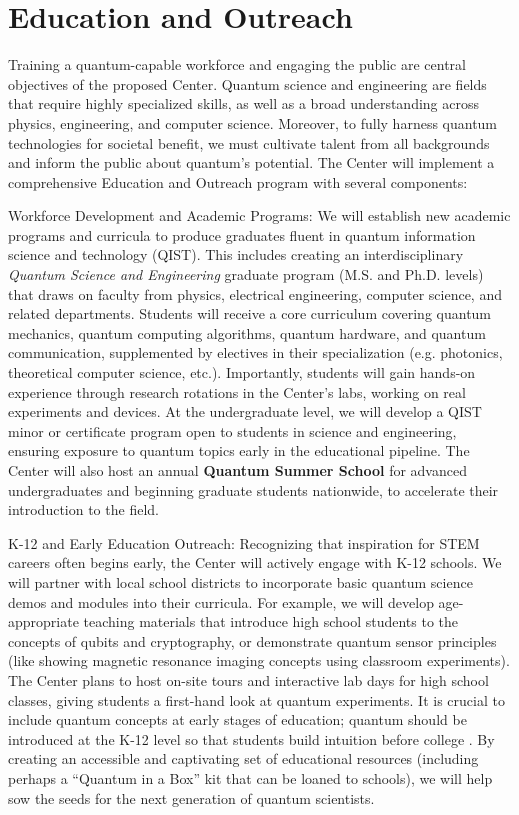 \documentclass[12pt]{article}
\begin{document}
\section{Education and Outreach}



Training a quantum-capable workforce and engaging the public are central objectives of the proposed Center. Quantum science and engineering are fields that require highly specialized skills, as well as a broad understanding across physics, engineering, and computer science. Moreover, to fully harness quantum technologies for societal benefit, we must cultivate talent from all backgrounds and inform the public about quantum’s potential. The Center will implement a comprehensive Education and Outreach program with several components:



Workforce Development and Academic Programs: We will establish new academic programs and curricula to produce graduates fluent in quantum information science and technology (QIST). This includes creating an interdisciplinary \emph{Quantum Science and Engineering} graduate program (M.S. and Ph.D. levels) that draws on faculty from physics, electrical engineering, computer science, and related departments. Students will receive a core curriculum covering quantum mechanics, quantum computing algorithms, quantum hardware, and quantum communication, supplemented by electives in their specialization (e.g. photonics, theoretical computer science, etc.). Importantly, students will gain hands-on experience through research rotations in the Center’s labs, working on real experiments and devices. At the undergraduate level, we will develop a QIST minor or certificate program open to students in science and engineering, ensuring exposure to quantum topics early in the educational pipeline. The Center will also host an annual \textbf{Quantum Summer School} for advanced undergraduates and beginning graduate students nationwide, to accelerate their introduction to the field.



K-12 and Early Education Outreach: Recognizing that inspiration for STEM careers often begins early, the Center will actively engage with K-12 schools. We will partner with local school districts to incorporate basic quantum science demos and modules into their curricula. For example, we will develop age-appropriate teaching materials that introduce high school students to the concepts of qubits and cryptography, or demonstrate quantum sensor principles (like showing magnetic resonance imaging concepts using classroom experiments). The Center plans to host on-site tours and interactive lab days for high school classes, giving students a first-hand look at quantum experiments. It is crucial to include quantum concepts at early stages of education; quantum should be introduced at the K-12 level so that students build intuition before college . By creating an accessible and captivating set of educational resources (including perhaps a “Quantum in a Box” kit that can be loaned to schools), we will help sow the seeds for the next generation of quantum scientists.
\end{document}
